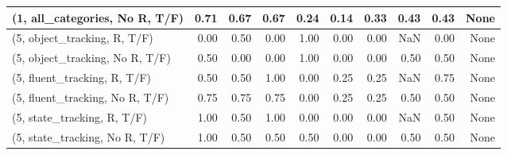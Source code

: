 \begin{table*}[h!]
\begin{adjustbox}{width=2\columnwidth,center}
\begin{tabular}{lrrr|rrr|rrr}
(1, all\_categories, No R, T/F)       &                      0.71 &                  0.67 &                      0.67 &                          0.24 &                      0.14 &                          0.33 &                                   0.43 &                               0.43 &                                  None \\



\midrule
(5, object\_tracking, R, T/F)         &                      0.00 &                  0.50 &                      0.00 &                          1.00 &                      0.00 &                          0.00 &                                    NaN &                               0.00 &                                  None \\
(5, object\_tracking, No R, T/F)      &                      0.50 &                  0.00 &                      0.00 &                          1.00 &                      0.00 &                          0.00 &                                   0.50 &                               0.50 &                                  None \\
(5, fluent\_tracking, R, T/F)         &                      0.50 &                  0.50 &                      1.00 &                          0.00 &                      0.25 &                          0.25 &                                    NaN &                               0.75 &                                  None \\
(5, fluent\_tracking, No R, T/F)      &                      0.75 &                  0.75 &                      0.75 &                          0.00 &                      0.25 &                          0.25 &                                   0.50 &                               0.50 &                                  None \\
(5, state\_tracking, R, T/F)          &                      1.00 &                  0.50 &                      1.00 &                          0.00 &                      0.00 &                          0.00 &                                    NaN &                               0.50 &                                  None \\
(5, state\_tracking, No R, T/F)       &                      1.00 &                  0.50 &                      0.50 &                          0.50 &                      0.00 &                          0.00 &                                   0.50 &                               0.50 &                                  None \\

\end{tabular}
\end{adjustbox}
\end{table*}
